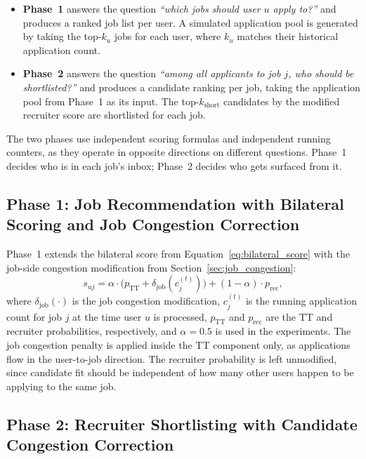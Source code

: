 \begin{itemize}
    \item \textbf{Phase~1} answers the question \emph{``which jobs
    should user $u$ apply to?''} and produces a ranked job list per
    user. A simulated application pool is generated by taking the
    top-$k_u$ jobs for each user, where $k_u$ matches their historical
    application count.
    \item \textbf{Phase~2} answers the question \emph{``among all
    applicants to job $j$, who should be shortlisted?''} and produces
    a candidate ranking per job, taking the application pool from
    Phase~1 as its input. The top-$k_{\text{short}}$ candidates by the modified recruiter score are shortlisted for each job.
\end{itemize}

The two phases use independent scoring formulas and independent running
counters, as they operate in opposite directions on different questions.
Phase~1 decides who is in each job's inbox; Phase~2 decides who gets
surfaced from it. 

\subsection{Phase 1: Job Recommendation with Bilateral Scoring and Job Congestion Correction}
\label{sec:hybrid_job_congestion}

Phase~1 extends the bilateral score from
Equation~\ref{eq:bilateral_score} with the job-side congestion
modification from Section~\ref{sec:job_congestion}:
\begin{equation}
    s_{uj} = \alpha \cdot \bigl(p_{\text{TT}} +
    \delta_{\text{job}}\!\left(c_j^{(t)}\right)\bigr)
    + (1 - \alpha) \cdot p_{\text{rec}},
    \label{eq:combined_score}
\end{equation}
where $\delta_{\text{job}}(\cdot)$ is the job congestion modification,
$c_j^{(t)}$ is the running application count for job $j$ at the time
user $u$ is processed, $p_{\text{TT}}$ and $p_{\text{rec}}$ are the \gls{TT} and recruiter probabilities, respectively, and $\alpha = 0.5$ is used in the experiments.
The job congestion penalty is applied inside the \gls{TT} component
only, as applications flow in the user-to-job direction. The recruiter
probability is left unmodified, since candidate fit should be
independent of how many other users happen to be applying to the same
job. 

\subsection{Phase 2: Recruiter Shortlisting with Candidate Congestion Correction}
\label{sec:hybrid_user_congestion}


